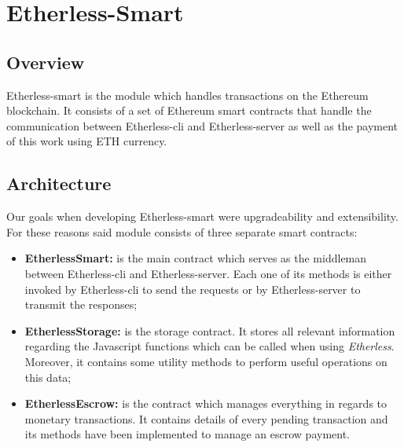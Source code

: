 \section{Etherless-Smart}
	
\subsection{Overview}
	Etherless-smart is the module which handles transactions on the Ethereum blockchain. It consists of a set of Ethereum smart contracts that handle the communication between Etherless-cli and Etherless-server as well as the payment of this work using ETH currency.
	
\subsection{Architecture} %
		Our goals when developing Etherless-smart were upgradeability and extensibility. For these reasons said module consists of three separate smart contracts:
		\begin{itemize}
			\item \textbf{EtherlessSmart:} is the main contract which serves as the middleman between Etherless-cli and Etherless-server. Each one of its methods is either invoked by Etherless-cli to send the requests or by Etherless-server to transmit the responses;
			\item \textbf{EtherlessStorage:} is the storage contract. It stores all relevant information regarding the Javascript functions which can be called when using \textit{Etherless}. Moreover, it contains some utility methods to perform useful operations on this data;
			\item \textbf{EtherlessEscrow:} is the contract which manages everything in regards to monetary transactions. It contains details of every pending transaction and its methods have been implemented to manage an escrow payment.
		\end{itemize}
		
